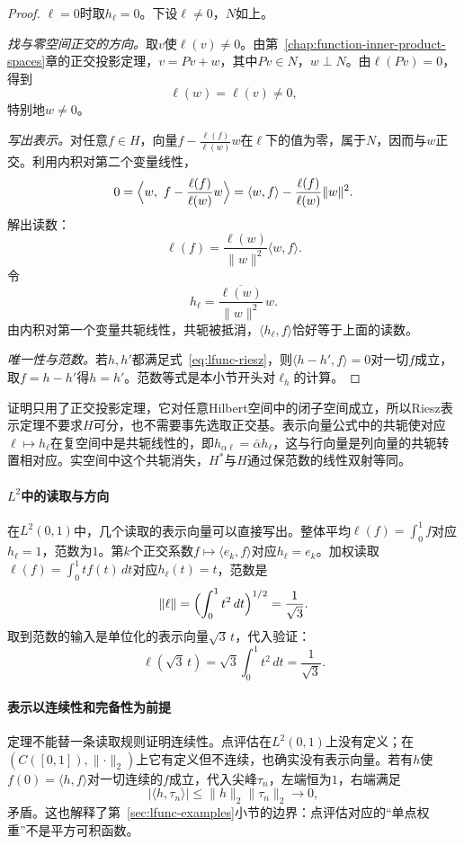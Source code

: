 \begin{proof}
$\ell=0$时取$h_\ell=0$。下设$\ell\neq0$，$N$如上。

\emph{找与零空间正交的方向。}取$v$使$\ell(v)\neq0$。由第~\ref{chap:function-inner-product-spaces}章的正交投影定理，$v=Pv+w$，其中$Pv\in N$，$w\perp N$。由$\ell(Pv)=0$，得到
\[
\ell(w)=\ell(v)\neq0 ,
\]
特别地$w\neq0$。

\emph{写出表示。}对任意$f\in H$，向量$f-\frac{\ell(f)}{\ell(w)}w$在$\ell$下的值为零，属于$N$，因而与$w$正交。利用内积对第二个变量线性，
\[
0=\Bigl\langle w,\ f-\frac{\ell(f)}{\ell(w)}w\Bigr\rangle=\langle w,f\rangle-\frac{\ell(f)}{\ell(w)}\lVert w\rVert^2 .
\]
解出读数：
\[
\ell(f)=\frac{\ell(w)}{\lVert w\rVert^2}\langle w,f\rangle .
\]
令
\[
h_\ell=\frac{\overline{\ell(w)}}{\lVert w\rVert^2}\,w .
\]
由内积对第一个变量共轭线性，共轭被抵消，$\langle h_\ell,f\rangle$恰好等于上面的读数。

\emph{唯一性与范数。}若$h,h'$都满足式~\eqref{eq:lfunc-riesz}，则$\langle h-h',f\rangle=0$对一切$f$成立，取$f=h-h'$得$h=h'$。范数等式是本小节开头对$\ell_h$的计算。
\end{proof}

证明只用了正交投影定理，它对任意Hilbert空间中的闭子空间成立，所以Riesz表示定理不要求$H$可分，也不需要事先选取正交基。表示向量公式中的共轭使对应$\ell\mapsto h_\ell$在复空间中是共轭线性的，即$h_{\alpha\ell}=\bar\alpha h_\ell$，这与行向量是列向量的共轭转置相对应。实空间中这个共轭消失，$H^*$与$H$通过保范数的线性双射等同。

\paragraph{\texorpdfstring{$L^2$}{L2}中的读取与方向}
在$L^2(0,1)$中，几个读取的表示向量可以直接写出。整体平均$\ell(f)=\int_0^1f$对应$h_\ell=1$，范数为$1$。第$k$个正交系数$f\mapsto\langle e_k,f\rangle$对应$h_\ell=e_k$。加权读取$\ell(f)=\int_0^1tf(t)\,dt$对应$h_\ell(t)=t$，范数是
\[
\lVert\ell\rVert=\Bigl(\int_0^1t^2\,dt\Bigr)^{1/2}=\frac1{\sqrt3} .
\]
取到范数的输入是单位化的表示向量$\sqrt3\,t$，代入验证：
\[
\ell(\sqrt3\,t)=\sqrt3\int_0^1t^2\,dt=\frac1{\sqrt3} .
\]

\paragraph{表示以连续性和完备性为前提}
定理不能替一条读取规则证明连续性。点评估在$L^2(0,1)$上没有定义；在$(C([0,1]),\lVert\cdot\rVert_2)$上它有定义但不连续，也确实没有表示向量。若有$h$使$f(0)=\langle h,f\rangle$对一切连续的$f$成立，代入尖峰$\tau_n$，左端恒为$1$，右端满足
\[
\lvert\langle h,\tau_n\rangle\rvert\leq\lVert h\rVert_2\lVert\tau_n\rVert_2\to0 ,
\]
矛盾。这也解释了第~\ref{sec:lfunc-examples}小节的边界：点评估对应的“单点权重”不是平方可积函数。

